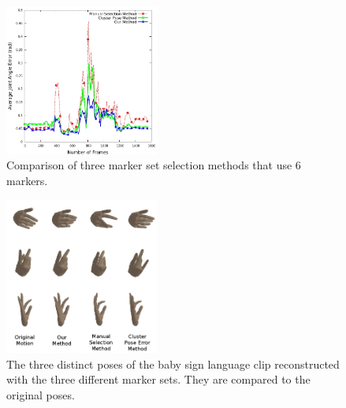 \begin{figure}
  \centering
  \includegraphics[trim = 28mm 0mm 0mm 0mm,
width=0.45\textwidth]{images/avgError_Marker_sets.jpg} %
  \caption{Comparison of three marker set selection methods that use 6 markers.}
  \label{fig:3_methods}
\end{figure}




\begin{figure}
  \centering
  \includegraphics[trim = 28mm 0mm 0mm 0mm,
width=0.45\textwidth]{images/compiled_babySigns1_poses.jpg} %
  \caption{The three distinct poses of the baby sign language clip
reconstructed with the three different marker sets. They are compared to
the original poses.}
  \label{fig:BabySigns_methods}
\end{figure}





